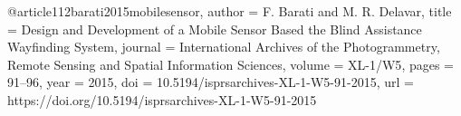 @article{112barati2015mobilesensor,
author    = {F. Barati and M. R. Delavar},
title     = {Design and Development of a Mobile Sensor Based the Blind Assistance Wayfinding System},
journal   = {International Archives of the Photogrammetry, Remote Sensing and Spatial Information Sciences},
volume    = {XL-1/W5},
pages     = {91--96},
year      = {2015},
doi       = {10.5194/isprsarchives-XL-1-W5-91-2015},
url       = {https://doi.org/10.5194/isprsarchives-XL-1-W5-91-2015}
}